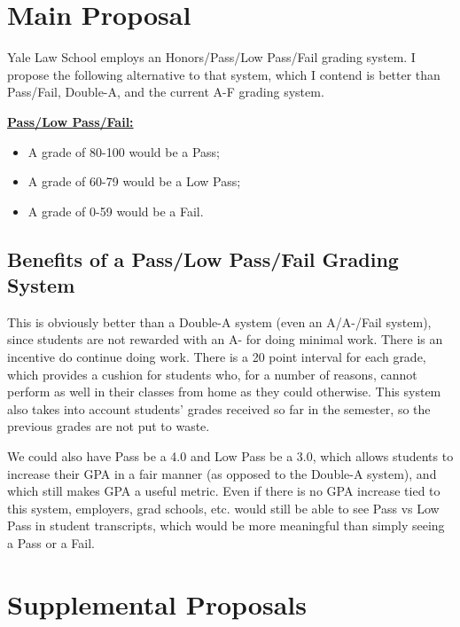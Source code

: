 \documentclass[12pt]{article}
\begin{document}
\newpage
\section{Main Proposal}

Yale Law School employs an Honors/Pass/Low Pass/Fail grading system. I propose the following alternative to that system, which I contend is better than Pass/Fail, Double-A, and the current A-F grading system.

\vspace{25pt}
\underline{\textbf{Pass/Low Pass/Fail:}}
\begin{itemize} 
\item A grade of 80-100 would be a Pass;
\item A grade of 60-79 would be a Low Pass;
\item A grade of 0-59 would be a Fail. 
\end{itemize}

\subsection{Benefits of a Pass/Low Pass/Fail Grading System}
This is obviously better than a Double-A system (even an A/A-/Fail system), since students are not rewarded with an A- for doing minimal work. There is an incentive do continue doing work. There is a 20 point interval for each grade, which provides a cushion for students who, for a number of reasons, cannot perform as well in their classes from home as they could otherwise. This system also takes into account students' grades received so far in the semester, so the previous grades are not put to waste. 
\par We could also have Pass be a 4.0 and Low Pass be a 3.0, which allows students to increase their GPA in a fair manner (as opposed to the Double-A system), and which still makes GPA a useful metric. Even if there is no GPA increase tied to this system, employers, grad schools, etc. would still be able to see Pass vs Low Pass in student transcripts, which would be more meaningful than simply seeing a Pass or a Fail.

\newpage
\section{Supplemental Proposals}
\end{document}
